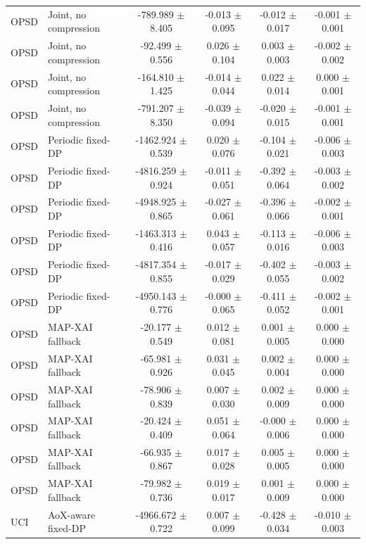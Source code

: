 \begin{table}[t]
\begin{tabular}{llcccc}
OPSD & Joint, no compression & -789.989 $\pm$ 8.405 & -0.013 $\pm$ 0.095 & -0.012 $\pm$ 0.017 & -0.001 $\pm$ 0.001 \\
OPSD & Joint, no compression & -92.499 $\pm$ 0.556 & 0.026 $\pm$ 0.104 & 0.003 $\pm$ 0.003 & -0.002 $\pm$ 0.002 \\
OPSD & Joint, no compression & -164.810 $\pm$ 1.425 & -0.014 $\pm$ 0.044 & 0.022 $\pm$ 0.014 & 0.000 $\pm$ 0.001 \\
OPSD & Joint, no compression & -791.207 $\pm$ 8.350 & -0.039 $\pm$ 0.094 & -0.020 $\pm$ 0.015 & -0.001 $\pm$ 0.001 \\
OPSD & Periodic fixed-DP & -1462.924 $\pm$ 0.539 & 0.020 $\pm$ 0.076 & -0.104 $\pm$ 0.021 & -0.006 $\pm$ 0.003 \\
OPSD & Periodic fixed-DP & -4816.259 $\pm$ 0.924 & -0.011 $\pm$ 0.051 & -0.392 $\pm$ 0.064 & -0.003 $\pm$ 0.002 \\
OPSD & Periodic fixed-DP & -4948.925 $\pm$ 0.865 & -0.027 $\pm$ 0.061 & -0.396 $\pm$ 0.066 & -0.002 $\pm$ 0.001 \\
OPSD & Periodic fixed-DP & -1463.313 $\pm$ 0.416 & 0.043 $\pm$ 0.057 & -0.113 $\pm$ 0.016 & -0.006 $\pm$ 0.003 \\
OPSD & Periodic fixed-DP & -4817.354 $\pm$ 0.855 & -0.017 $\pm$ 0.029 & -0.402 $\pm$ 0.055 & -0.003 $\pm$ 0.002 \\
OPSD & Periodic fixed-DP & -4950.143 $\pm$ 0.776 & -0.000 $\pm$ 0.065 & -0.411 $\pm$ 0.052 & -0.002 $\pm$ 0.001 \\
OPSD & MAP-XAI fallback & -20.177 $\pm$ 0.549 & 0.012 $\pm$ 0.081 & 0.001 $\pm$ 0.005 & 0.000 $\pm$ 0.000 \\
OPSD & MAP-XAI fallback & -65.981 $\pm$ 0.926 & 0.031 $\pm$ 0.045 & 0.002 $\pm$ 0.004 & 0.000 $\pm$ 0.000 \\
OPSD & MAP-XAI fallback & -78.906 $\pm$ 0.839 & 0.007 $\pm$ 0.030 & 0.002 $\pm$ 0.009 & 0.000 $\pm$ 0.000 \\
OPSD & MAP-XAI fallback & -20.424 $\pm$ 0.409 & 0.051 $\pm$ 0.064 & -0.000 $\pm$ 0.006 & 0.000 $\pm$ 0.000 \\
OPSD & MAP-XAI fallback & -66.935 $\pm$ 0.867 & 0.017 $\pm$ 0.028 & 0.005 $\pm$ 0.005 & 0.000 $\pm$ 0.000 \\
OPSD & MAP-XAI fallback & -79.982 $\pm$ 0.736 & 0.019 $\pm$ 0.017 & 0.001 $\pm$ 0.009 & 0.000 $\pm$ 0.000 \\
UCI & AoX-aware fixed-DP & -4966.672 $\pm$ 0.722 & 0.007 $\pm$ 0.099 & -0.428 $\pm$ 0.034 & -0.010 $\pm$ 0.003 \\

\end{tabular}
\end{table}
